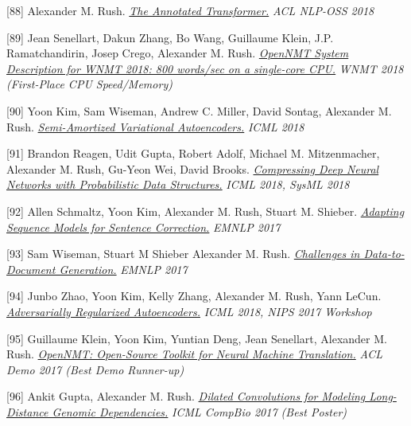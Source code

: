 \documentclass[10pt]{article}
\begin{document}
\medskip


[88] \ind Alexander M. Rush. \emph{\href{ http://aclweb.org/anthology/W18-2509 }{ The Annotated Transformer.} }\emph{ ACL NLP-OSS 2018 }

\medskip


[89] \ind Jean Senellart, Dakun Zhang, Bo Wang, Guillaume Klein, J.P. Ramatchandirin, Josep Crego, Alexander M. Rush. \emph{\href{ http://aclweb.org/anthology/W18-2715 }{ OpenNMT System Description for WNMT 2018: 800 words/sec on a single-core CPU.} }\emph{ WNMT 2018  (First-Place CPU Speed/Memory) }

\medskip


[90] \ind Yoon Kim, Sam Wiseman, Andrew C. Miller, David Sontag, Alexander M. Rush. \emph{\href{ https://arxiv.org/abs/1802.02550 }{ Semi-Amortized Variational Autoencoders.} }\emph{ ICML 2018 }

\medskip


[91] \ind Brandon Reagen, Udit Gupta, Robert Adolf, Michael M. Mitzenmacher, Alexander M. Rush, Gu-Yeon Wei, David Brooks. \emph{\href{ https://www.sysml.cc/doc/68.pdf }{ Compressing Deep Neural Networks with Probabilistic Data Structures.} }\emph{ ICML 2018, SysML 2018 }

\medskip


[92] \ind Allen Schmaltz, Yoon Kim, Alexander M. Rush, Stuart M. Shieber. \emph{\href{ https://arxiv.org/abs/1707.09067 }{ Adapting Sequence Models for Sentence Correction.} }\emph{ EMNLP 2017 }

\medskip


[93] \ind Sam Wiseman, Stuart M Shieber Alexander M. Rush. \emph{\href{ https://arxiv.org/abs/1707.08052 }{ Challenges in Data-to-Document Generation.} }\emph{ EMNLP 2017 }

\medskip


[94] \ind Junbo Zhao, Yoon Kim, Kelly Zhang, Alexander M. Rush, Yann LeCun. \emph{\href{ https://arxiv.org/abs/1706.04223 }{ Adversarially Regularized Autoencoders.} }\emph{ ICML 2018, NIPS 2017 Workshop }

\medskip


[95] \ind Guillaume Klein, Yoon Kim, Yuntian Deng, Jean Senellart, Alexander M. Rush. \emph{\href{ https://arxiv.org/abs/1701.02810 }{ OpenNMT: Open-Source Toolkit for Neural Machine Translation.} }\emph{ ACL Demo 2017 (Best Demo Runner-up) }

\medskip


[96] \ind Ankit Gupta, Alexander M. Rush. \emph{\href{ https://arxiv.org/abs/1710.01278 }{ Dilated Convolutions for Modeling Long-Distance Genomic Dependencies.} }\emph{ ICML CompBio 2017 (Best Poster) }
\end{document}
